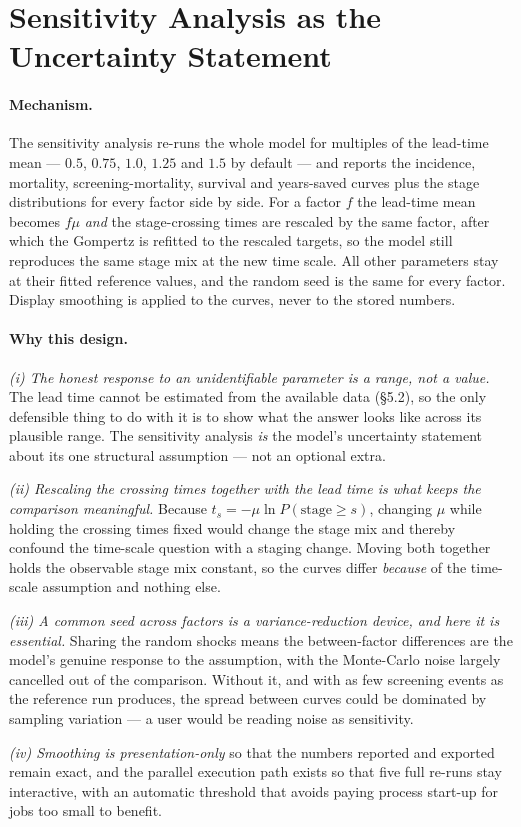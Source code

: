 \documentclass[12pt,a4paper]{article}
\newcommand{\mech}[1]{\paragraph{Mechanism.} #1}
\newcommand{\why}[1]{\paragraph{Why this design.} #1}
\begin{document}
\section{Sensitivity Analysis as the Uncertainty Statement}
\label{sec:sens}

\mech{The sensitivity analysis re-runs the whole model for multiples of the lead-time mean --- $0.5$,
$0.75$, $1.0$, $1.25$ and $1.5$ by default --- and reports the incidence, mortality, screening-mortality,
survival and years-saved curves plus the stage distributions for every factor side by side. For a factor
$f$ the lead-time mean becomes $f\mu$ \emph{and} the stage-crossing times are rescaled by the same factor,
after which the Gompertz is refitted to the rescaled targets, so the model still reproduces the same stage
mix at the new time scale. All other parameters stay at their fitted reference values, and the random seed
is the same for every factor. Display smoothing is applied to the curves, never to the stored numbers.}

\why{\emph{(i) The honest response to an unidentifiable parameter is a range, not a value.} The lead time
cannot be estimated from the available data (\S5.2), so the only defensible thing to do with it is to show
what the answer looks like across its plausible range. The sensitivity analysis \emph{is} the model's
uncertainty statement about its one structural assumption --- not an optional extra.

\emph{(ii) Rescaling the crossing times together with the lead time is what keeps the comparison
meaningful.} Because $t_s=-\mu\ln P(\text{stage}\ge s)$, changing $\mu$ while holding the crossing times
fixed would change the stage mix and thereby confound the time-scale question with a staging change. Moving
both together holds the observable stage mix constant, so the curves differ \emph{because} of the time-scale
assumption and nothing else.

\emph{(iii) A common seed across factors is a variance-reduction device, and here it is essential.} Sharing
the random shocks means the between-factor differences are the model's genuine response to the assumption,
with the Monte-Carlo noise largely cancelled out of the comparison. Without it, and with as few screening
events as the reference run produces, the spread between curves could be dominated by sampling variation
--- a user would be reading noise as sensitivity.

\emph{(iv) Smoothing is presentation-only} so that the numbers reported and exported remain exact, and the
parallel execution path exists so that five full re-runs stay interactive, with an automatic threshold that
avoids paying process start-up for jobs too small to benefit.}
\end{document}
